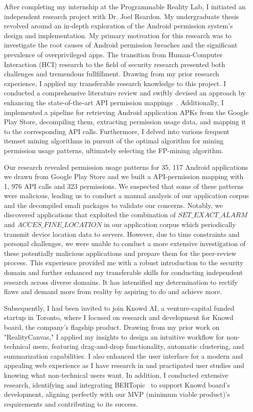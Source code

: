 \documentclass{article}
\begin{document}
After completing my internship at the Programmable Reality Lab, I initiated an independent research project with Dr. Joel Reardon.
My undergraduate thesis revolved around an in-depth exploration of the Android permission system's design and implementation. 
My primary motivation for this research was to investigate the root causes of Android permission breaches 
and the significant prevalence of overprivileged apps.
The transition from Human-Computer Interaction (HCI) research to the field of security research presented both challenges and 
tremendous fullfillment. Drawing from my prior research experience, I applied my transferable research knowledge to this project. 
I conducted a comprehensive literature review and swiftly devised an approach by enhancing the state-of-the-art API 
permission mappings~\cite{felt2011android,au2012pscout}. Additionally, I implemented a pipeline for retrieving Android application APKs from the Google Play Store, 
decompiling them, extracting permission usage data, and mapping it to the corresponding API calls. 
Furthermore, I delved into various frequent itemset mining algorithms in pursuit of the optimal algorithm for 
mining permission usage patterns, ultimately selecting the FP-mining algorithm.

Our research revealed permission usage patterns for 35, 117 Android
applications we drawn from Google Play Store and we built a 
API-permission mapping with 1, 976 API calls and 323 permissions. We suspected that some of these patterns were malicious, 
leading us to conduct a manual analysis of our application corpus and the decompiled smali packages to
validate our concerns. Notably, we discovered applications that exploited the combination of \textit{$SET\_EXACT\_ALARM$} and 
\textit{$ACCES\_FINE\_LOCATION$} in our application corpus which periodically transmit device location data to servers. 
However, due to time constraints and personal challenges, we were unable to conduct a 
more extensive investigation of these potentially malicious applications and prepare them for the peer-review process.
This experience provided me with a robust introduction to the security domain and further enhanced my transferable skills 
for conducting independent research across diverse domains. It has intensified my determination to rectify
flaws and demand more from reality by aspiring to do and achieve more.




Subsequently, I had been invited to join Knowd AI, a venture-capital funded startup in Toronto, where I focused on 
research and development for Knowd board, the company's flagship product. 
Drawing from my prior work on "RealityCanvas," I applied my insights to design an intuitive 
workflow for non-technical users, featuring drag-and-drop functionality, automatic clustering, 
and summarization capabilities. I also enhanced the user interface for a modern and appealing web experience as I have 
research in and practipated user studies and knowing what non-technical users want. 
In addition, I conducted extensive research, identifying and integrating BERTopic~\cite{BERT} to support Knowd board's development, 
aligning perfectly with our MVP (minimum viable product)'s requirements and contributing to its success.
\end{document}
